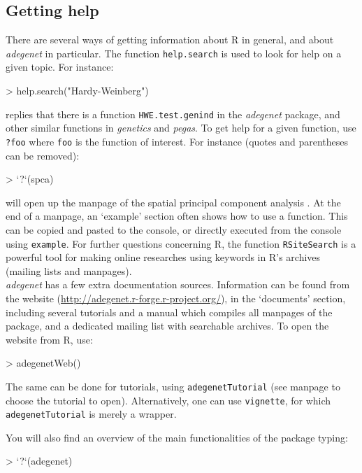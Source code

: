 \documentclass{article}
\begin{document}
\subsection{Getting help}
There are several ways of getting information about R in general, and about
\textit{adegenet} in particular.
The function \texttt{help.search} is used to look for help on a given topic.
For instance:
\begin{Schunk}
\begin{Sinput}
> help.search("Hardy-Weinberg")
\end{Sinput}
\end{Schunk}
replies that there is a function \texttt{HWE.test.genind} in the
\textit{adegenet} package, and other similar functions in \textit{genetics} and \textit{pegas}.
To get help for a given function, use \texttt{?foo} where \texttt{foo} is the
function of interest.
For instance (quotes and parentheses can be removed):
\begin{Schunk}
\begin{Sinput}
> `?`(spca)
\end{Sinput}
\end{Schunk}
will open up the manpage of the spatial principal component analysis \cite{tjart04}.
At the end of a manpage, an `example' section often shows how to use a function.
This can be copied and pasted to the console, or directly executed
from the console using \texttt{example}.
For further questions concerning R, the function \texttt{RSiteSearch}
is a powerful tool for making online researches using keywords in R's archives (mailing
lists and manpages).
\\


\textit{adegenet} has a few extra documentation sources.
Information can be found from the website
(\url{http://adegenet.r-forge.r-project.org/}), in the `documents'
section, including several tutorials and a manual which compiles all
manpages of the package, and a dedicated mailing list with searchable archives.
To open the website from R, use:
\begin{Schunk}
\begin{Sinput}
> adegenetWeb()
\end{Sinput}
\end{Schunk}
The same can be done for tutorials, using \texttt{adegenetTutorial} (see
manpage to choose the tutorial to open).
Alternatively, one can use \texttt{vignette}, for which \texttt{adegenetTutorial} is merely a wrapper.

You will also find an overview of the main functionalities of the package typing:
\begin{Schunk}
\begin{Sinput}
> `?`(adegenet)
\end{Sinput}
\end{Schunk}
\end{document}
